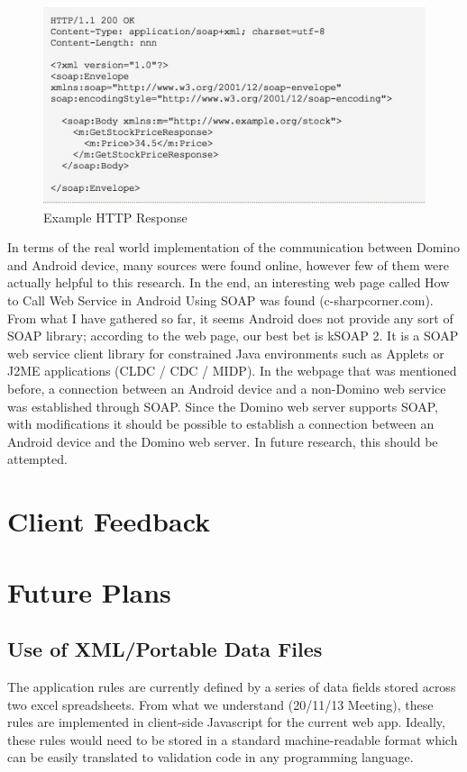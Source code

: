 \documentclass[12pt,a4paper,oneside,titlepage]{article}
\begin{document}
\begin{figure}[h!]
\centering
\includegraphics[scale=0.7]{img/soap-3.jpg}
\caption{Example HTTP Response}
\end{figure}

In terms of the real world implementation of the communication between Domino and Android device, many sources were found online, however few of them were actually helpful to this research. In the end, an interesting web page called How to Call Web Service in Android Using SOAP was found (c-sharpcorner.com). From what I have gathered so far, it seems Android does not provide any sort of SOAP library; according to the web page, our best bet is kSOAP 2. It is a SOAP web service client library for constrained Java environments such as Applets or J2ME applications (CLDC / CDC / MIDP). In the webpage that was mentioned before, a connection between an Android device and a non-Domino web service was established through SOAP. Since the Domino web server supports SOAP, with modifications it should be possible to establish a connection between an Android device and the Domino web server. In future research, this should be attempted.

\newpage
\section{Client Feedback}

\newpage
\section{Future Plans}
\subsection{Use of XML/Portable Data Files}
The application rules are currently defined by a series of data fields stored across two excel spreadsheets. From what we understand (20/11/13 Meeting), these rules are implemented in client-side Javascript for the current web app. Ideally, these rules would need to be stored in a standard machine-readable format which can be easily translated to validation code in any programming language.
\end{document}
